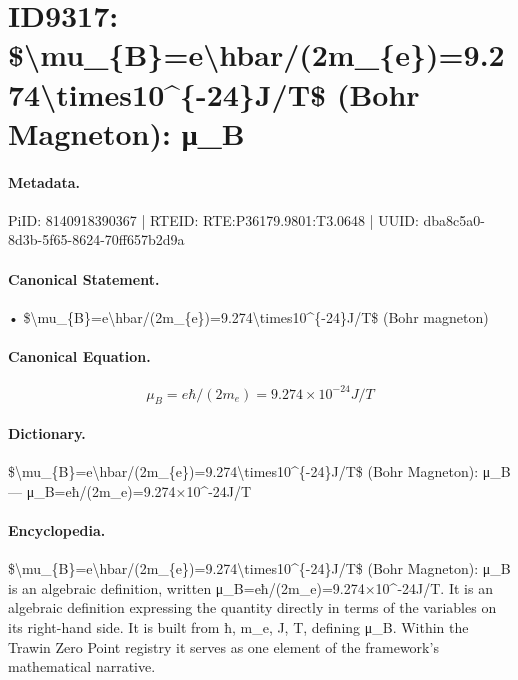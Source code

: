 \section*{ID9317: \$\textbackslash{}mu\_\{B\}=e\textbackslash{}hbar/(2m\_\{e\})=9.274\textbackslash{}times10\textasciicircum{}\{-24\}J/T\$ (Bohr Magneton): μ\_B}
\paragraph{Metadata.}
PiID: 8140918390367 | RTEID: RTE:P36179.9801:T3.0648 | UUID: dba8c5a0-8d3b-5f65-8624-70ff657b2d9a

\paragraph{Canonical Statement.}
• \$\textbackslash{}mu\_\{B\}=e\textbackslash{}hbar/(2m\_\{e\})=9.274\textbackslash{}times10\textasciicircum{}\{-24\}J/T\$ (Bohr magneton)

\paragraph{Canonical Equation.}
\[
\mu_{B}=e\hbar/(2m_{e})=9.274\times10^{-24}J/T
\]

\paragraph{Dictionary.}
\$\textbackslash{}mu\_\{B\}=e\textbackslash{}hbar/(2m\_\{e\})=9.274\textbackslash{}times10\textasciicircum{}\{-24\}J/T\$ (Bohr Magneton): μ\_B — μ\_B=eħ/(2m\_e)=9.274×10\textasciicircum{}-24J/T

\paragraph{Encyclopedia.}
\$\textbackslash{}mu\_\{B\}=e\textbackslash{}hbar/(2m\_\{e\})=9.274\textbackslash{}times10\textasciicircum{}\{-24\}J/T\$ (Bohr Magneton): μ\_B is an algebraic definition, written μ\_B=eħ/(2m\_e)=9.274×10\textasciicircum{}-24J/T. It is an algebraic definition expressing the quantity directly in terms of the variables on its right-hand side. It is built from ħ, m\_e, J, T, defining μ\_B. Within the Trawin Zero Point registry it serves as one element of the framework's mathematical narrative.
